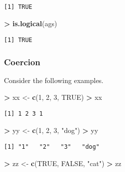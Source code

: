 \documentclass[]{krantz}
\makeatletter
\newenvironment{Shaded}{\begin{snugshade}}{\end{snugshade}}
\newcommand{\DecValTok}[1]{\textcolor[rgb]{0.06,0.06,0.06}{#1}}
\newcommand{\KeywordTok}[1]{\textcolor[rgb]{0.27,0.27,0.27}{\textbf{#1}}}
\newcommand{\NormalTok}[1]{#1}
\newcommand{\OperatorTok}[1]{\textcolor[rgb]{0.43,0.43,0.43}{\textbf{#1}}}
\newcommand{\OtherTok}[1]{\textcolor[rgb]{0.37,0.37,0.37}{#1}}
\newcommand{\StringTok}[1]{\textcolor[rgb]{0.5,0.5,0.5}{#1}}
\newenvironment{kframe}{%
\medskip{}
\setlength{\fboxsep}{.8em}
 \def\at@end@of@kframe{}%
 \ifinner\ifhmode%
  \def\at@end@of@kframe{\end{minipage}}%
  \begin{minipage}{\columnwidth}%
 \fi\fi%
 \def\FrameCommand##1{\hskip\@totalleftmargin \hskip-\fboxsep
 \colorbox{shadecolor}{##1}\hskip-\fboxsep
     \hskip-\linewidth \hskip-\@totalleftmargin \hskip\columnwidth}%
 \MakeFramed {\advance\hsize-\width
   \@totalleftmargin\z@ \linewidth\hsize
   \@setminipage}}%
 {\par\unskip\endMakeFramed%
 \at@end@of@kframe}
\renewenvironment{Shaded}{\begin{kframe}}{\end{kframe}}
\makeatother
\begin{document}
\begin{verbatim}
[1] TRUE
\end{verbatim}

\begin{Shaded}
\begin{Highlighting}[]
\OperatorTok{>}\StringTok{ }\KeywordTok{is.logical}\NormalTok{(ags)}
\end{Highlighting}
\end{Shaded}

\begin{verbatim}
[1] TRUE
\end{verbatim}

\hypertarget{coercion}{%
\subsubsection{Coercion}\label{coercion}}

Consider the following examples.

\begin{Shaded}
\begin{Highlighting}[]
\OperatorTok{>}\StringTok{ }\NormalTok{xx <-}\StringTok{ }\KeywordTok{c}\NormalTok{(}\DecValTok{1}\NormalTok{, }\DecValTok{2}\NormalTok{, }\DecValTok{3}\NormalTok{, }\OtherTok{TRUE}\NormalTok{)}
\OperatorTok{>}\StringTok{ }\NormalTok{xx}
\end{Highlighting}
\end{Shaded}

\begin{verbatim}
[1] 1 2 3 1
\end{verbatim}

\begin{Shaded}
\begin{Highlighting}[]
\OperatorTok{>}\StringTok{ }\NormalTok{yy <-}\StringTok{ }\KeywordTok{c}\NormalTok{(}\DecValTok{1}\NormalTok{, }\DecValTok{2}\NormalTok{, }\DecValTok{3}\NormalTok{, }\StringTok{"dog"}\NormalTok{)}
\OperatorTok{>}\StringTok{ }\NormalTok{yy}
\end{Highlighting}
\end{Shaded}

\begin{verbatim}
[1] "1"   "2"   "3"   "dog"
\end{verbatim}

\begin{Shaded}
\begin{Highlighting}[]
\OperatorTok{>}\StringTok{ }\NormalTok{zz <-}\StringTok{ }\KeywordTok{c}\NormalTok{(}\OtherTok{TRUE}\NormalTok{, }\OtherTok{FALSE}\NormalTok{, }\StringTok{"cat"}\NormalTok{)}
\OperatorTok{>}\StringTok{ }\NormalTok{zz}
\end{Highlighting}
\end{Shaded}
\end{document}
